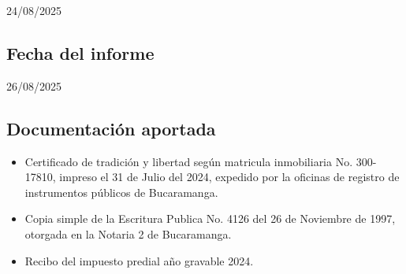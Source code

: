 \documentclass[12pt,a4paper,twoside]{article}
\begin{document}
24/08/2025

\subsection{Fecha del informe}

26/08/2025

\subsection{Documentación aportada}

\begin{itemize}
\item Certificado de tradición y libertad según matricula inmobiliaria No. 300-17810, impreso el 31 de Julio del 2024, expedido por la oficinas de registro de instrumentos públicos de Bucaramanga.
\item Copia simple de la Escritura Publica No. 4126 del 26 de Noviembre de 1997, otorgada en la Notaria 2 de Bucaramanga.
\item Recibo del impuesto predial año gravable 2024.

\end{itemize}

\end{document}
